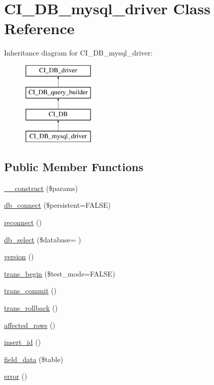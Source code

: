 \hypertarget{class_c_i___d_b__mysql__driver}{}\section{C\+I\+\_\+\+D\+B\+\_\+mysql\+\_\+driver Class Reference}
\label{class_c_i___d_b__mysql__driver}
Inheritance diagram for C\+I\+\_\+\+D\+B\+\_\+mysql\+\_\+driver\+:\begin{figure}[H]
\begin{center}
\leavevmode
\includegraphics[height=4.000000cm]{class_c_i___d_b__mysql__driver}
\end{center}
\end{figure}
\subsection*{Public Member Functions}
\begin{DoxyCompactItemize}
\item 
\hyperlink{class_c_i___d_b__mysql__driver_a9162320adff1a1a4afd7f2372f753a3e}{\+\_\+\+\_\+construct} (\$params)
\item 
\hyperlink{class_c_i___d_b__mysql__driver_a52bf595e79e96cc0a7c907a9b45aeb4d}{db\+\_\+connect} (\$persistent=F\+A\+L\+S\+E)
\item 
\hyperlink{class_c_i___d_b__mysql__driver_a57c19c642ab3023e28d10c50f86ff0a8}{reconnect} ()
\item 
\hyperlink{class_c_i___d_b__mysql__driver_a0f25caba4648e1a5ec88fcfe767d5f12}{db\+\_\+select} (\$database= \textquotesingle{}\textquotesingle{})
\item 
\hyperlink{class_c_i___d_b__mysql__driver_a6080dae0886626b9a4cedb29240708b1}{version} ()
\item 
\hyperlink{class_c_i___d_b__mysql__driver_a90e153cf190d273336d77cce930587e1}{trans\+\_\+begin} (\$test\+\_\+mode=F\+A\+L\+S\+E)
\item 
\hyperlink{class_c_i___d_b__mysql__driver_af4fbdcdace4aa94a139b64877601fe9b}{trans\+\_\+commit} ()
\item 
\hyperlink{class_c_i___d_b__mysql__driver_a53f76d4dfcd6ac04fb653982442aeef8}{trans\+\_\+rollback} ()
\item 
\hyperlink{class_c_i___d_b__mysql__driver_a77248aaad33eb132c04cc4aa3f4bc8cb}{affected\+\_\+rows} ()
\item 
\hyperlink{class_c_i___d_b__mysql__driver_a933f2cde8dc7f87875e257d0a4902e99}{insert\+\_\+id} ()
\item 
\hyperlink{class_c_i___d_b__mysql__driver_a90355121e1ed009e0efdbd544ab56efa}{field\+\_\+data} (\$table)
\item 
\hyperlink{class_c_i___d_b__mysql__driver_a43b8d30b879d4f09ceb059b02af2bc02}{error} ()
\end{DoxyCompactItemize}
